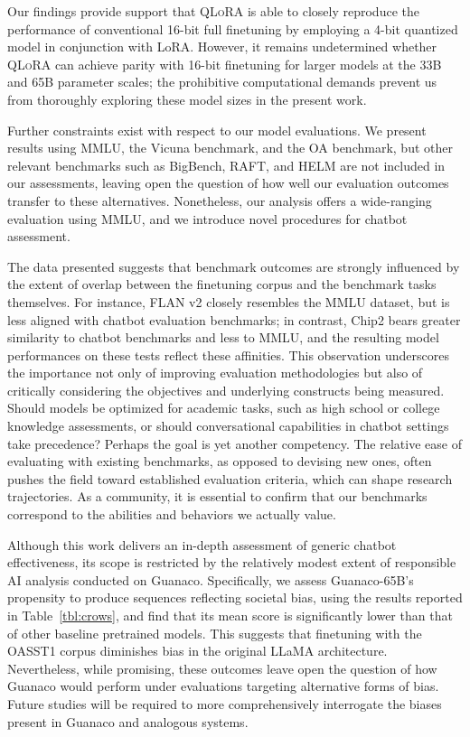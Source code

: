 Our findings provide support that \textsc{QLoRA} is able to closely reproduce the performance of conventional 16-bit full finetuning by employing a 4-bit quantized model in conjunction with LoRA. However, it remains undetermined whether \textsc{QLoRA} can achieve parity with 16-bit finetuning for larger models at the 33B and 65B parameter scales; the prohibitive computational demands prevent us from thoroughly exploring these model sizes in the present work.

Further constraints exist with respect to our model evaluations. We present results using MMLU, the Vicuna benchmark, and the OA benchmark, but other relevant benchmarks such as BigBench, RAFT, and HELM are not included in our assessments, leaving open the question of how well our evaluation outcomes transfer to these alternatives. Nonetheless, our analysis offers a wide-ranging evaluation using MMLU, and we introduce novel procedures for chatbot assessment.

The data presented suggests that benchmark outcomes are strongly influenced by the extent of overlap between the finetuning corpus and the benchmark tasks themselves. For instance, FLAN v2 closely resembles the MMLU dataset, but is less aligned with chatbot evaluation benchmarks; in contrast, Chip2 bears greater similarity to chatbot benchmarks and less to MMLU, and the resulting model performances on these tests reflect these affinities. This observation underscores the importance not only of improving evaluation methodologies but also of critically considering the objectives and underlying constructs being measured. Should models be optimized for academic tasks, such as high school or college knowledge assessments, or should conversational capabilities in chatbot settings take precedence? Perhaps the goal is yet another competency. The relative ease of evaluating with existing benchmarks, as opposed to devising new ones, often pushes the field toward established evaluation criteria, which can shape research trajectories. As a community, it is essential to confirm that our benchmarks correspond to the abilities and behaviors we actually value.

Although this work delivers an in-depth assessment of generic chatbot effectiveness, its scope is restricted by the relatively modest extent of responsible AI analysis conducted on {Guanaco}. Specifically, we assess {Guanaco}-65B’s propensity to produce sequences reflecting societal bias, using the results reported in Table~\ref{tbl:crows}, and find that its mean score is significantly lower than that of other baseline pretrained models. This suggests that finetuning with the OASST1 corpus diminishes bias in the original LLaMA architecture. Nevertheless, while promising, these outcomes leave open the question of how {Guanaco} would perform under evaluations targeting alternative forms of bias. Future studies will be required to more comprehensively interrogate the biases present in {Guanaco} and analogous systems.

